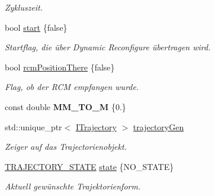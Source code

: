 \begin{DoxyCompactItemize}
\begin{DoxyCompactList}\small\item\em Zykluszeit. \end{DoxyCompactList}\item 
\hypertarget{classTrajectoryGenerator_acebd9fea08097528dbf013d327c39f7c}{bool \hyperlink{classTrajectoryGenerator_acebd9fea08097528dbf013d327c39f7c}{start} \{false\}}\label{classTrajectoryGenerator_acebd9fea08097528dbf013d327c39f7c}

\begin{DoxyCompactList}\small\item\em Startflag, die über Dynamic Reconfigure übertragen wird. \end{DoxyCompactList}\item 
\hypertarget{classTrajectoryGenerator_a4692340647fc11a62aec0cd32194cb45}{bool \hyperlink{classTrajectoryGenerator_a4692340647fc11a62aec0cd32194cb45}{rcm\-Position\-There} \{false\}}\label{classTrajectoryGenerator_a4692340647fc11a62aec0cd32194cb45}

\begin{DoxyCompactList}\small\item\em Flag, ob der R\-C\-M empfangen wurde. \end{DoxyCompactList}\item 
\hypertarget{classTrajectoryGenerator_ab32e4cd8abfe7740a3f7113fbff506b7}{const double {\bfseries M\-M\-\_\-\-T\-O\-\_\-\-M} \{0.\}}\label{classTrajectoryGenerator_ab32e4cd8abfe7740a3f7113fbff506b7}

\item 
std\-::unique\-\_\-ptr$<$ \hyperlink{classITrajectory}{I\-Trajectory} $>$ \hyperlink{classTrajectoryGenerator_ad945c2000eeab78342a67d627886e211}{trajectory\-Gen}
\begin{DoxyCompactList}\small\item\em Zeiger auf das Trajectorienobjekt. \end{DoxyCompactList}\item 
\hypertarget{classTrajectoryGenerator_a3ac417739c130895c6fbdea8b751d496}{\hyperlink{TrajectoryGenerator_8h_ab7e9971a19ca76371c40959c478f6618}{T\-R\-A\-J\-E\-C\-T\-O\-R\-Y\-\_\-\-S\-T\-A\-T\-E} \hyperlink{classTrajectoryGenerator_a3ac417739c130895c6fbdea8b751d496}{state} \{N\-O\-\_\-\-S\-T\-A\-T\-E\}}\label{classTrajectoryGenerator_a3ac417739c130895c6fbdea8b751d496}

\begin{DoxyCompactList}\small\item\em Aktuell gewünschte Trajektorienform. \end{DoxyCompactList}\end{DoxyCompactItemize}



